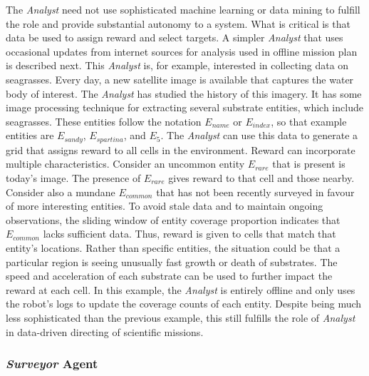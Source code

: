 \documentclass{tamuccthesis}
\begin{document}
The \textit{Analyst} need not use sophisticated machine learning or data mining to fulfill the role and provide substantial autonomy to a system. What is critical is that data be used to assign reward and select targets. A simpler \textit{Analyst} that uses occasional updates from internet sources for analysis used in offline mission plan is described next. This \textit{Analyst} is, for example, interested in collecting data on seagrasses. Every day, a new satellite image is available that captures the water body of interest. The \textit{Analyst} has studied the history of this imagery. It has some image processing technique for extracting several substrate entities, which include seagrasses. These entities follow the notation $E_{name}$ or $E_{index}$, so that example entities are $E_{sandy}$, $E_{spartina}$, and $E_{5}$. The \textit{Analyst} can use this data to generate a grid that assigns reward to all cells in the environment. Reward can incorporate multiple characteristics. Consider an uncommon entity $E_{rare}$ that is present is today's image. The presence of $E_{rare}$ gives reward to that cell and those nearby. Consider also a mundane $E_{common}$ that has not been recently surveyed in favour of more interesting entities. To avoid stale data and to maintain ongoing observations, the sliding window of entity coverage proportion indicates that $E_{common}$ lacks sufficient data. Thus, reward is given to cells that match that entity's locations. Rather than specific entities, the situation could be that a particular region is seeing unusually fast growth or death of substrates. The speed and acceleration of each substrate can be used to further impact the reward at each cell. In this example, the \textit{Analyst} is entirely offline and only uses the robot's logs to update the coverage counts of each entity. Despite being much less sophisticated than the previous example, this still fulfills the role of \textit{Analyst} in data-driven directing of scientific missions. 

\subsubsection{\textit{Surveyor} Agent}
\end{document}
